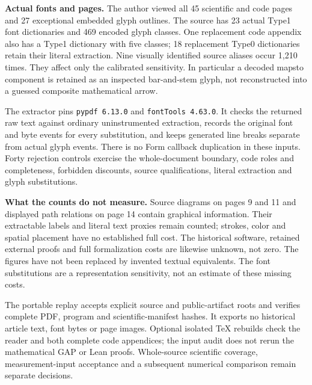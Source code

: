\documentclass[a4paper,11pt]{article}
\begin{document}
\textbf{Actual fonts and pages.} The author viewed all 45 scientific and code
pages and 27 exceptional embedded glyph outlines. The source has 23 actual
Type1 font dictionaries and 469 encoded glyph classes. One replacement code
appendix also has a Type1 dictionary with five classes; 18 replacement Type0
dictionaries retain their literal extraction. Nine visually identified source
aliases occur 1,210 times. They affect only the calibrated sensitivity. In
particular a decoded mapsto component is retained as an inspected bar-and-stem
glyph, not reconstructed into a guessed composite mathematical arrow.

The extractor pins \texttt{pypdf 6.13.0} and \texttt{fontTools 4.63.0}. It
checks the returned raw text against ordinary uninstrumented extraction,
records the original font and byte events for every substitution, and keeps
generated line breaks separate from actual glyph events. There is no Form
callback duplication in these inputs. Forty rejection controls exercise the
whole-document boundary, code roles and completeness, forbidden discounts,
source qualifications, literal extraction and glyph substitutions.

\textbf{What the counts do not measure.} Source diagrams on pages 9 and 11
and displayed path relations on page 14 contain graphical information. Their
extractable labels and literal text proxies remain counted; strokes, color
and spatial placement have no established full cost. The historical software,
retained external proofs and full formalization costs are likewise unknown,
not zero. The figures have not been replaced by invented textual equivalents.
The font substitutions are a representation sensitivity, not an estimate of
these missing costs.

The portable replay accepts explicit source and public-artifact roots and
verifies complete PDF, program and scientific-manifest hashes. It exports no
historical article text, font bytes or page images. Optional isolated TeX
rebuilds check the reader and both complete code appendices; the input audit
does not rerun the mathematical GAP or Lean proofs. Whole-source scientific
coverage, measurement-input acceptance and a subsequent numerical comparison
remain separate decisions.
\end{document}
